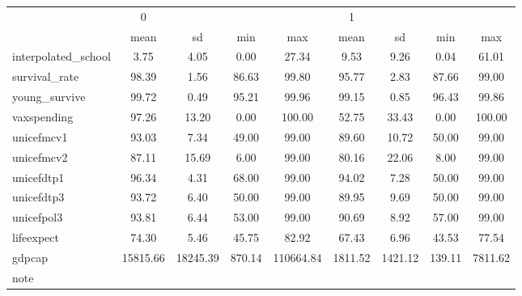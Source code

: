 \begin{tabular}{l*{2}{cccc}}
\toprule
            &           0&            &            &            &           1&            &            &            \\
            &        mean&          sd&         min&         max&        mean&          sd&         min&         max\\
\midrule
interpolated\_school&        3.75&        4.05&        0.00&       27.34&        9.53&        9.26&        0.04&       61.01\\
survival\_rate&       98.39&        1.56&       86.63&       99.80&       95.77&        2.83&       87.66&       99.00\\
young\_survive&       99.72&        0.49&       95.21&       99.96&       99.15&        0.85&       96.43&       99.86\\
vaxspending &       97.26&       13.20&        0.00&      100.00&       52.75&       33.43&        0.00&      100.00\\
unicefmcv1  &       93.03&        7.34&       49.00&       99.00&       89.60&       10.72&       50.00&       99.00\\
unicefmcv2  &       87.11&       15.69&        6.00&       99.00&       80.16&       22.06&        8.00&       99.00\\
unicefdtp1  &       96.34&        4.31&       68.00&       99.00&       94.02&        7.28&       50.00&       99.00\\
unicefdtp3  &       93.72&        6.40&       50.00&       99.00&       89.95&        9.69&       50.00&       99.00\\
unicefpol3  &       93.81&        6.44&       53.00&       99.00&       90.69&        8.92&       57.00&       99.00\\
lifeexpect  &       74.30&        5.46&       45.75&       82.92&       67.43&        6.96&       43.53&       77.54\\

gdpcap      &    15815.66&    18245.39&      870.14&   110664.84&     1811.52&     1421.12&      139.11&     7811.62\\
\bottomrule
\multicolumn{9}{l}{\footnotesize note}\\
\end{tabular}
